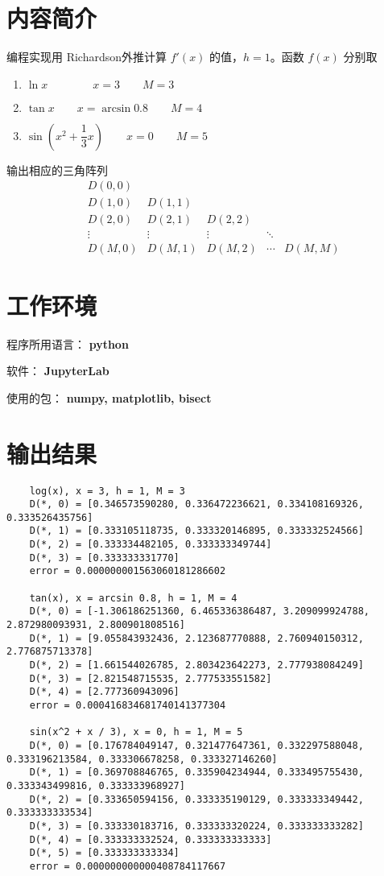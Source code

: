 \documentclass{ctexart}
\begin{document}
\section*{内容简介}
	 编程实现用 Richardson外推计算 $f'(x)$ 的值，$h = 1$。函数 $f(x)$ 分别取
	 \begin{enumerate}
	 	\item $\ln x \qquad\qquad x = 3 \qquad M = 3$
	 	\item $\tan x \qquad x = \arcsin 0.8 \qquad M = 4$
	 	\item $\sin(x^2 + \dfrac{1}{3}x) \qquad x = 0 \qquad M = 5$
	 \end{enumerate}
 	输出相应的三角阵列
 	\begin{equation*}
	 	\begin{matrix}
	 		& D(0, 0) & & & &\\
	 		& D(1, 0) & D(1, 1) & & &\\
	 		& D(2, 0) & D(2, 1) & D(2, 2) & &\\
	 		& \vdots & \vdots & \vdots & \ddots &\\
	 		& D(M, 0) & D(M, 1) & D(M, 2) & \cdots & D(M, M)
	 	\end{matrix}
	\end{equation*}
	 	
\section*{工作环境}
	程序所用语言： {\bf python}
	
	软件： {\bf JupyterLab}
	
	使用的包： {\bf numpy, matplotlib, bisect}

\section*{输出结果}

\begin{verbatim}
	log(x), x = 3, h = 1, M = 3
	D(*, 0) = [0.346573590280, 0.336472236621, 0.334108169326, 0.333526435756]
	D(*, 1) = [0.333105118735, 0.333320146895, 0.333332524566]
	D(*, 2) = [0.333334482105, 0.333333349744]
	D(*, 3) = [0.333333331770]
	error = 0.000000001563060181286602
	
	tan(x), x = arcsin 0.8, h = 1, M = 4
	D(*, 0) = [-1.306186251360, 6.465336386487, 3.209099924788, 2.872980093931, 2.800901808516]
	D(*, 1) = [9.055843932436, 2.123687770888, 2.760940150312, 2.776875713378]
	D(*, 2) = [1.661544026785, 2.803423642273, 2.777938084249]
	D(*, 3) = [2.821548715535, 2.777533551582]
	D(*, 4) = [2.777360943096]
	error = 0.000416834681740141377304
	
	sin(x^2 + x / 3), x = 0, h = 1, M = 5
	D(*, 0) = [0.176784049147, 0.321477647361, 0.332297588048, 0.333196213584, 0.333306678258, 0.333327146260]
	D(*, 1) = [0.369708846765, 0.335904234944, 0.333495755430, 0.333343499816, 0.333333968927]
	D(*, 2) = [0.333650594156, 0.333335190129, 0.333333349442, 0.333333333534]
	D(*, 3) = [0.333330183716, 0.333333320224, 0.333333333282]
	D(*, 4) = [0.333333332524, 0.333333333333]
	D(*, 5) = [0.333333333334]
	error = 0.000000000000408784117667
\end{verbatim}
\end{document}
